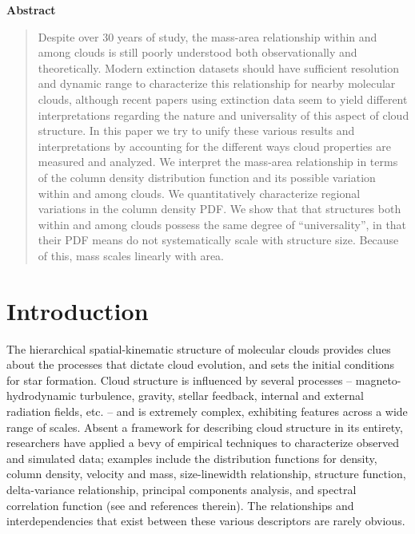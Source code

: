  \begin{center}
  \bfseries Abstract
\end{center}
 \begin{quote}
Despite over 30 years of study, the mass-area relationship within and among clouds is still poorly understood both observationally and theoretically. Modern extinction datasets should have sufficient resolution and dynamic range to characterize this relationship for nearby molecular clouds, although recent papers using extinction data seem to yield different interpretations regarding the nature and universality of this aspect of cloud structure. In this paper we try to unify these various results and interpretations by accounting for the different ways cloud properties are measured and analyzed. We interpret the mass-area relationship in terms of the column density distribution function and its possible variation within and among clouds. We quantitatively characterize regional variations in the column density PDF. We show that that structures both within and among clouds possess the same degree of ``universality'', in that their PDF means do not systematically scale with structure size. Because of this, mass scales linearly with area.
\end{quote}

\maketitle

\section{Introduction}
The hierarchical spatial-kinematic structure of molecular clouds provides clues about the processes that dictate cloud evolution, and sets the initial conditions for star formation. Cloud structure is influenced by several processes -- magneto-hydrodynamic turbulence, gravity, stellar feedback, internal and external radiation fields, etc. -- and is extremely complex, exhibiting features across a wide range of scales. Absent a framework for describing cloud structure in its entirety, researchers have applied a bevy of empirical techniques to characterize observed and simulated data; examples include the distribution functions for density, column density, velocity and mass, size-linewidth relationship, structure function, delta-variance relationship, principal components analysis, and spectral correlation function (see \citealt{Elmegreen04} and references therein). The relationships and interdependencies that exist between these various descriptors are rarely obvious.

